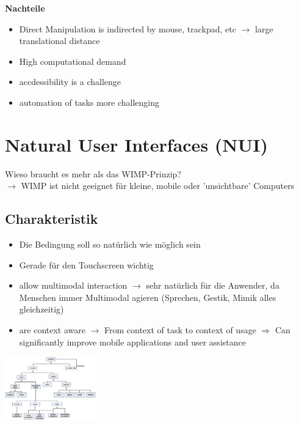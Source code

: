 \documentclass{report}
\newenvironment{Figure}
	{\par\medskip\noindent\minipage{\linewidth}}
	{\endminipage\par\medskip}
\theoremstyle{definition}
\theoremstyle{example}
\begin{document}
\textbf{Nachteile}

\begin{itemize}
   \item Direct Manipulation is indirected by mouse, trackpad, etc $\rightarrow$ large translational distance
   \item High computational demand
   \item accdessibility is a challenge
   \item automation of tasks more challenging
\end{itemize}

\section*{Natural User Interfaces (NUI)}
Wieso braucht es mehr als das WIMP-Prinzip?\\
$\rightarrow$ WIMP ist nicht geeignet für kleine, mobile oder 'unsichtbare' Computers

\subsection{Charakteristik}
\begin{itemize}
   \item Die Bedingung soll so natürlich wie möglich sein
   \item Gerade für den Touchscreen wichtig
   \item allow multimodal interaction $\rightarrow$ sehr natürlich für die Anwender, da Menschen immer Multimodal agieren (Sprechen, Gestik, Mimik alles gleichzeitig)
   \item are context aware $\rightarrow$ From context of task to context of usage $\Rightarrow$ Can significantly improve mobile applications and user assistance
\end{itemize}

\begin{Figure}
   \centering
    \includegraphics[width=150px]{img/OverviewModalities.png}
        \label{fig:Overview Modalities}
\end{Figure}
\end{document}
